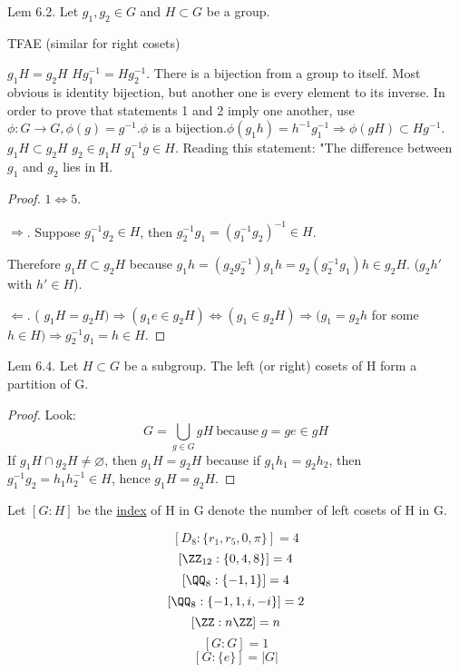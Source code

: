 \documentclass[11pt]{scrartcl}
\begin{document}
\begin{theorem}
  Lem 6.2. Let $g_1, g_2 \in G$ and $H \subset G$ be a group.

  TFAE (similar for right cosets)

  \begin{enumerate}
    \ii
    $g_1H = g_2H$ 
    \ii
    $Hg_1^{-1} = Hg_2^{-1}$. There is a bijection from a group to itself. Most obvious is identity bijection, but another one is every element to its inverse. In order to prove that statements 1 and 2 imply one another, use $\phi: G \to G, \phi(g) = g^{-1}. \phi$ is a bijection.$\phi(g_1h) = h^{-1}g_1^{-1} \Rightarrow \phi(gH) \subset Hg^{-1}$.
    \ii
    $g_1H \subset g_2H$ 
    \ii
    $g_2 \in g_1H$
    \ii
    $g_1^{-1}g \in H$. Reading this statement: "The difference between $g_1$ and $g_2$ lies in H.
  \end{enumerate}

  \begin{proof}
    $1 \Leftrightarrow 5$.

    $\Rightarrow$. Suppose $g_1^{-1}g_2 \in H$, then $g_2^{-1}g_1 = (g_1^{-1}g_2)^{-1} \in H$.

    Therefore $g_1H \subset g_2H$ because $g_1h = (g_2g_2^{-1})g_1h = g_2(g_2^{-1}g_1)h \in g_2H$. ($g_2h'$ with $h' \in H$).

    $\Leftarrow$. ( $g_1H = g_2H) \Rightarrow (g_1e \in g_2H) \Leftrightarrow (g_1 \in g_2H) \Rightarrow (g_1 = g_2h$ for some $h\in H) \Rightarrow g_2^{-1}g_1 = h \in H$.
  \end{proof}


\end{theorem}

\begin{theorem}
  Lem 6.4. Let $H \subset G$ be a subgroup. The left (or right) cosets of H form a partition of G.
  \begin{proof}
    Look:
    $$G = \bigcup_{g\in G}gH \ \text{because} \ g = ge \in gH$$
    If $g_1H\cap g_2H \neq \varnothing$, then $g_1H = g_2H$ because if $g_1h_1 = g_2h_2$, then $g_1^{-1}g_2 = h_1h_2^{-1} \in H$, hence $g_1H = g_2H$.
  \end{proof}
\end{theorem}

\begin{definition}
  Let $[G:H]$ be the \ul{index} of H in G denote the number of left cosets of H in G.
  \begin{example}
    $$[D_8:\{r_1, r_5, 0, \pi\}] = 4$$
    $$[\ZZ_{12}:\{0, 4, 8\}] = 4$$
    $$[\QQ_{8}:\{-1, 1\}] = 4$$
    $$[\QQ_{8}:\{-1, 1, i, -i\}] = 2$$
    $$[\ZZ: n\ZZ] = n$$
    $$[G:G] = 1$$
    $$[G:\{e\}] = |G|$$
  \end{example}
\end{definition}
\end{document}
